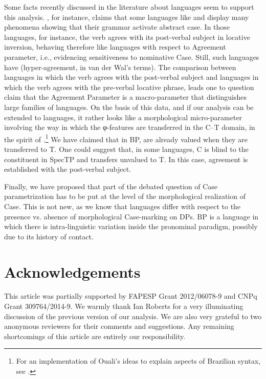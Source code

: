 \documentclass[output=paper]{langsci/langscibook}
\begin{document}
Some facts recently discussed in the literature about  languages seem to
support this analysis. , for instance, claims that
some  languages like  and  display many
phenomena showing that their grammar activate abstract case. In those
languages, for instance, the verb agrees with its post-verbal subject in
locative inversion, behaving therefore like  languages with
respect to  Agreement parameter, i.e., evidencing
sensitiveness to nominative Case. Still, such languages have 
(hyper-agreement, in van der Wal’s terms).  The comparison between 
languages in which the verb agrees with the post-verbal subject and 
languages in which the verb agrees with the pre-verbal locative phrase, leads
one to question  claim that the Agreement Parameter is a
macro-parameter that distinguishes large families of languages. On the basis of
this data, and if our analysis can be extended to  languages, it rather
looks like a morphological micro-parameter involving the way in which the
φ-features are transferred in the C--T domain, in the spirit of
\citet{Ouali2008}.\footnote{For an implementation of Ouali’s ideas to explain
aspects of Brazilian syntax, see \citet{Toniette2013}.} We have claimed that in
BP,  are already valued when they are transferred to T.  One could
suggest that, in some languages, C is blind to the constituent in SpecTP and
transfers unvalued  to T. In this case, agreement is established with
the post-verbal subject.

Finally, we have proposed that part of the debated question of Case
parametrization has to be put at the level of the morphological realization of
Case. This is not new, as we know that languages differ with respect to the
presence vs. absence of morphological Case-marking on DPs.  BP is a language in
which there is intra-linguistic variation inside the pronominal paradigm,
possibly due to its history of contact.

\printchapterglossary{}

\section*{Acknowledgements}

This article was partially supported by FAPESP Grant 2012/06078-9 and CNPq
Grant 309764/2014-9. We warmly thank Ian Roberts for a very illuminating
discussion of the previous version of our analysis. We are also very grateful
to two anonymous reviewers for their comments and suggestions. Any remaining
shortcomings of this article are entirely our responsibility.

{\sloppy
\printbibliography[heading=subbibliography,notkeyword=this]
}
\end{document}
